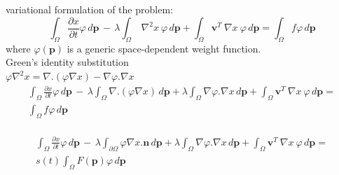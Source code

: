 \documentclass{beamer}
\newcommand{\mb}{\mathbf}
\begin{document}
\begin{frame}
variational formulation of the problem:\\
\[
	\int_\Omega \frac{\partial x}{\partial t} \varphi \, d\mb{p} \, - \,
	\lambda \int_\Omega ~\nabla^2 x~ \varphi \, d\mb{p} +
	\int_\Omega \mb{v}^T  ~\nabla x~ \varphi \, d\mb{p} =
	\int_\Omega f \varphi \, d\mb{p}
	\]
	where $\varphi(\mb{p})$ is a generic space-dependent weight function.
\\ 	
\vspace{2mm}
Green's identity substitution\\
$\varphi \nabla^2 x = \nabla . (\varphi \nabla x) - \nabla \varphi . \nabla x$\\

\[
\begin{array}{l}
	\displaystyle
	\int_\Omega \frac{\partial x}{\partial t} \varphi \, d\mb{p} \, - \,
	\lambda \int_\Omega \nabla . (\varphi \nabla x) \, d\mb{p} + \lambda \int_\Omega \nabla \varphi . \nabla x \, d\mb{p} +
	\int_\Omega \mb{v}^T  ~\nabla x~ \varphi \, d\mb{p} = \\ [4mm]
	\displaystyle
	\int_\Omega f \varphi \, d\mb{p}
\end{array}
	\]\\
	
	\[
	\begin{array}{l}
	\displaystyle
	\int_\Omega \frac{\partial x}{\partial t} \varphi \, d\mb{p} \, - \,
	\lambda \int_{\partial \Omega} \varphi \nabla x . \mb{n} \, d\mb{p} + \lambda \int_\Omega \nabla \varphi . \nabla x \, d\mb{p} +
	\int_\Omega \mb{v}^T  ~\nabla x~ \varphi \, d\mb{p} = \\ [4mm]
	\displaystyle
	s(t) \int_\Omega F(\mb{p}) \varphi \, d\mb{p}
	
	\end{array}
	\]
	
	


\end{frame}
\end{document}
